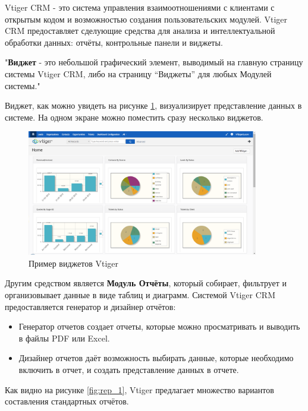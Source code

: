 Vtiger CRM - это система управления взаимоотношениями с клиентами с открытым кодом и возможностью создания пользовательских модулей. Vtiger CRM предоставляет сделующие средства для анализа и интеллектуальной обработки данных: отчёты, контрольные панели и виджеты. 

"\textbf{Виджет} - это небольшой графический элемент, выводимый на главную страницу системы Vtiger CRM, либо на страницу “Виджеты” для любых Модулей системы." \cite{salesplatform}
	
Виджет, как можно увидеть на рисунке \ref{fig:widget}, визуализирует представление данных в системе. На одном экране можно поместить сразу несколько виджетов.
	
\begin{figure}[htbp]
	\centering
	\includegraphics[width=0.9\textwidth]{fig/chapter_1/widget}
	\caption{Пример виджетов Vtiger}
	\label{fig:widget}
\end{figure}

Другим средством является \textbf{Модуль Отчёты}, который собирает, фильтрует и организовывает данные в виде таблиц и диаграмм. Системой Vtiger CRM предоставляется генератор и дизайнер отчётов:

\begin{itemize}
	\item Генератор отчетов создает отчеты, которые можно просматривать и выводить в файлы PDF или Excel.
	
	\item Дизайнер отчетов даёт возможность выбирать данные, которые необходимо включить в отчет, и создать представление данных в отчете.
\end{itemize}

Как видно на рисунке \ref{fig:rep_1}, Vtiger предлагает множество вариантов составления стандартных отчётов.

